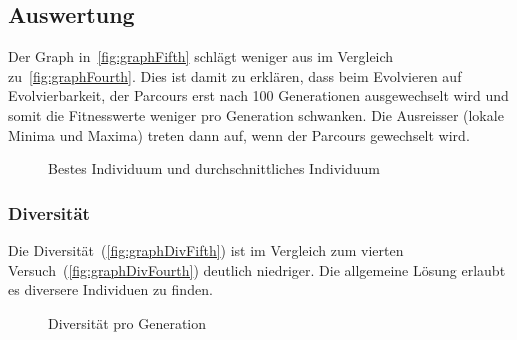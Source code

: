     \subsection{Auswertung\label{sub:fifthAuswertung}}

      Der Graph in~\vref{fig:graphFifth} schlägt weniger aus im Vergleich zu~\vref{fig:graphFourth}.
      Dies ist damit zu erklären, dass beim Evolvieren auf Evolvierbarkeit,
      der Parcours erst nach 100 Generationen ausgewechselt wird und
      somit die Fitnesswerte weniger pro Generation schwanken.
      Die Ausreisser (lokale Minima und Maxima) treten dann auf, wenn der Parcours gewechselt wird.

      \begin{figure}[H]
        \centering
        
        \caption{Bestes Individuum und durchschnittliches Individuum\label{fig:graphFifth}}
      \end{figure}

      \subsubsection{Diversität}

        Die Diversität~(\vref{fig:graphDivFifth}) ist im Vergleich zum vierten Versuch~(\vref{fig:graphDivFourth}) deutlich niedriger.
        Die allgemeine Lösung erlaubt es diversere Individuen zu finden.

        \begin{figure}[H]
          \centering
          
          \caption{Diversität pro Generation\label{fig:graphDivFifth}}
        \end{figure}
